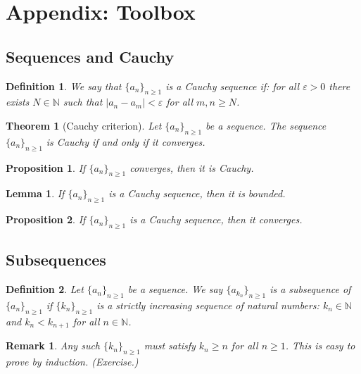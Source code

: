 \documentclass[12pt]{article}
\newtheorem*{lemma}{Lemma}
\newtheorem*{remark}{Remark}
\newtheorem{theorem}{Theorem}
\newtheorem{proposition}{Proposition}
\newtheorem{definition}{Definition}
\begin{document}
\newpage
\appendix
\section*{Appendix: Toolbox}

\subsection*{Sequences and Cauchy}
\begin{definition}
We say that $\{a_n\}_{n\ge 1}$ is a Cauchy sequence if:
for all $\varepsilon>0$ there exists $N\in\mathbb{N}$ such that
$|a_n-a_m|<\varepsilon$ for all $m,n\ge N$.
\end{definition}

\begin{theorem}[Cauchy criterion]
Let $\{a_n\}_{n\ge 1}$ be a sequence. The sequence $\{a_n\}_{n\ge 1}$ is
Cauchy if and only if it converges.
\end{theorem}

\begin{proposition}
If $\{a_n\}_{n\ge 1}$ converges, then it is Cauchy.
\end{proposition}

\begin{lemma}
If $\{a_n\}_{n\ge 1}$ is a Cauchy sequence, then it is bounded.
\end{lemma}

\begin{proposition}
If $\{a_n\}_{n\ge 1}$ is a Cauchy sequence, then it converges.
\end{proposition}

\subsection*{Subsequences}
\begin{definition}
Let $\{a_n\}_{n\ge 1}$ be a sequence. We say $\{a_{k_n}\}_{n\ge 1}$ is a
subsequence of $\{a_n\}_{n\ge 1}$ if $\{k_n\}_{n\ge 1}$ is a strictly increasing
sequence of natural numbers: $k_n\in\mathbb{N}$ and $k_n<k_{n+1}$ for all
$n\in\mathbb{N}$.
\end{definition}

\begin{remark}
Any such $\{k_n\}_{n\ge 1}$ must satisfy $k_n\ge n$ for all $n\ge 1$.
This is easy to prove by induction. (Exercise.)
\end{remark}
\end{document}

